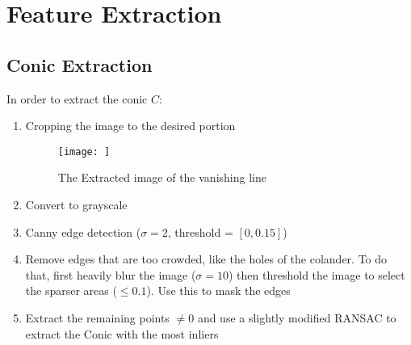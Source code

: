 \chapter{Feature Extraction}
\label{ch:Feature Extraction}

\section{Conic Extraction}
In order to extract the conic $C$:
\begin{enumerate}
    \item Cropping the image to the desired portion
    \begin{figure}[H]
    \centering
    \texttt{[image: ]}
    \caption{\label{fig:Vanishing Line}The Extracted image of the vanishing line}
    \end{figure}

    \item Convert to grayscale

    \item Canny edge detection ($\sigma = 2$, threshold = $[0, 0.15]$)

    \item Remove edges that are too crowded, like the holes of the colander. To do that, first heavily blur the image ($\sigma = 10$) then threshold the image to select the sparser areas ($\leq 0.1$). Use this to mask the edges

    \item Extract the remaining points $\neq 0$ and use a slightly modified RANSAC to extract the Conic with the most inliers 
\end{enumerate}